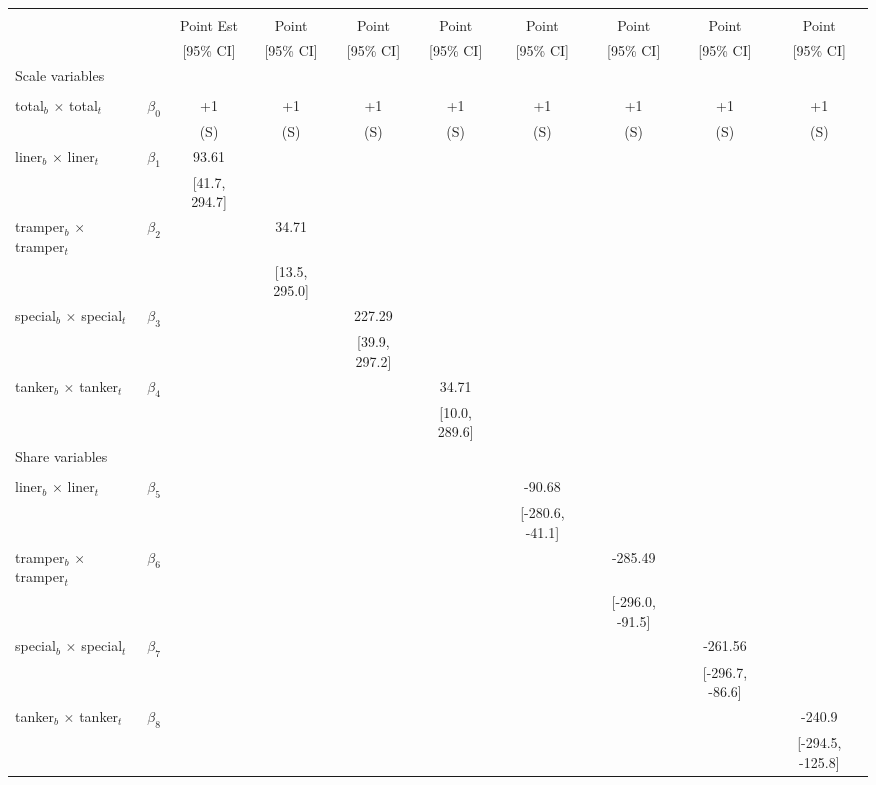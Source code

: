 \begin{tabular}{@{\extracolsep{5pt}}lccccccccc}
\toprule 
 &  &  &  &  &  &  &  &  &  \\
 &  & Point Est & Point & Point & Point & Point & Point & Point & Point \\
 &  & [95\% CI] & [95\% CI] & [95\% CI] & [95\% CI] & [95\% CI] & [95\% CI] & [95\% CI] & [95\% CI] \\
\midrule 
Scale variables &  &  &  &  &  &  &  \\
 &  &  &  &  &  &  &  &  \\
total$_{b}$ $\times$ total$_{t}$ & $\beta_0$ & +1 & +1 & +1 & +1 & +1 & +1 & +1 & +1 \\
 &  & (S) & (S) & (S) & (S) & (S) & (S) & (S) & (S) \\
liner$_{b}$ $\times$ liner$_{t}$ & $\beta_1$ & 93.61 &  &  &  &  &  &  &  \\
 &  & [41.7, 294.7] &  &  &  &  &  &  &  \\
tramper$_{b}$ $\times$ tramper$_{t}$ & $\beta_2$ &  & 34.71 &  &  &  &  &  &  \\
 &  &  & [13.5, 295.0] &  &  &  &  &  &  \\
special$_{b}$ $\times$ special$_{t}$ & $\beta_3$ &  &  & 227.29 &  &  &  &  &  \\
 &  &  &  & [39.9, 297.2] &  &  &  &  &  \\
tanker$_{b}$ $\times$ tanker$_{t}$ & $\beta_4$ &  &  &  & 34.71 &  &  &  &  \\
 &  &  &  &  & [10.0, 289.6] &  &  &  &  \\
Share variables &  &  &  &  &  &  &  &  &  \\
 &  &  &  &  &  &  &  &  &  \\
liner$_{b}$ $\times$ liner$_{t}$ & $\beta_5$ &  &  &  &  & -90.68 &  &  &  \\
 &  &  &  &  &  & [-280.6, -41.1] &  &  &  \\
tramper$_{b}$ $\times$ tramper$_{t}$ & $\beta_6$ &  &  &  &  &  & -285.49 &  &  \\
 &  &  &  &  &  &  & [-296.0, -91.5] &  &  \\
special$_{b}$ $\times$ special$_{t}$ & $\beta_7$ &  &  &  &  &  &  & -261.56 &  \\
 &  &  &  &  &  &  &  & [-296.7, -86.6] &  \\
tanker$_{b}$ $\times$ tanker$_{t}$ & $\beta_8$ &  &  &  &  &  &  &  & -240.9 \\
 &  &  &  &  &  &  &  &  & [-294.5, -125.8] \\

\end{tabular}
